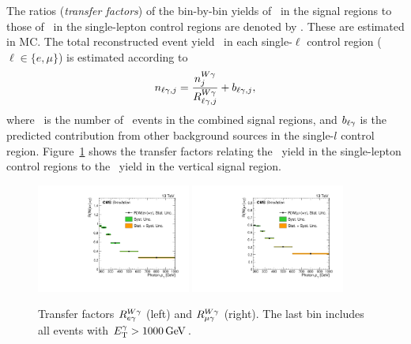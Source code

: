 The ratios (\textit{transfer factors}) of the bin-by-bin yields of \wlng\ in the signal regions to those
of \wlng\ in the single-lepton control regions are denoted by \RWl[,j]. These are estimated in MC.
The total reconstructed event yield \nl\ in each single-$\ell$ control region ($\ell \in \{e,\mu\}$) is estimated according to
\begin{equation}
  \nl[,j] = \frac{\nWg[j]}{\RWl[,j]} + b_{\ell\Pgamma,j},
\end{equation}
where \nWg\ is the number of \wlng\ events in the combined signal regions, and
$b_{\ell\Pgamma}$ is the predicted contribution from other background sources in the single-$l$ control region.
Figure~\ref{fig:tf_w} shows the transfer factors relating the \wlng\ yield in the single-lepton control regions to the \wlng\ yield in the
vertical signal region.

\begin{figure}[htbp]
  \begin{center}
    \includegraphics[width=0.45\textwidth]{Figures/results/transfer_WGinZnnG_over_WGinWenG_phoPt.pdf}
    \includegraphics[width=0.45\textwidth]{Figures/results/transfer_WGinZnnG_over_WGinWmnG_phoPt.pdf}
    \caption{
          Transfer factors $R^{\PW\Pgamma}_{\Pe\Pgamma}$ (left) and $R^{\PW\Pgamma}_{\Pmu\Pgamma}$ (right). The last bin includes all events with $\ETgamma > 1000\unit{GeV}$.
    }
    \label{fig:tf_w}
  \end{center}
\end{figure}

